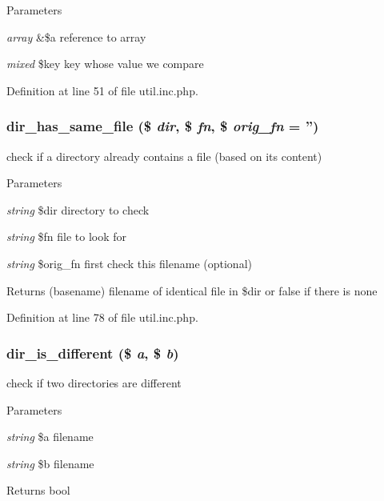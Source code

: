 \begin{DoxyParams}{Parameters}
\item[{\em array}]\&\$a reference to array \item[{\em mixed}]\$key key whose value we compare \end{DoxyParams}


Definition at line 51 of file util.inc.php.

\hypertarget{util_8inc_8php_a7f3e06b0a6f405290cb4d7990b8ac5c6}{
\subsubsection[{dir\_\-has\_\-same\_\-file}]{\setlength{\rightskip}{0pt plus 5cm}dir\_\-has\_\-same\_\-file (\$ {\em dir}, \/  \$ {\em fn}, \/  \$ {\em orig\_\-fn} = {\ttfamily ''})}}
\label{util_8inc_8php_a7f3e06b0a6f405290cb4d7990b8ac5c6}
check if a directory already contains a file (based on its content)


\begin{DoxyParams}{Parameters}
\item[{\em string}]\$dir directory to check \item[{\em string}]\$fn file to look for \item[{\em string}]\$orig\_\-fn first check this filename (optional) \end{DoxyParams}
\begin{DoxyReturn}{Returns}
(basename) filename of identical file in \$dir or false if there is none 
\end{DoxyReturn}


Definition at line 78 of file util.inc.php.

\hypertarget{util_8inc_8php_a6309f576f2611237288d0dd3eed09db3}{
\subsubsection[{dir\_\-is\_\-different}]{\setlength{\rightskip}{0pt plus 5cm}dir\_\-is\_\-different (\$ {\em a}, \/  \$ {\em b})}}
\label{util_8inc_8php_a6309f576f2611237288d0dd3eed09db3}
check if two directories are different


\begin{DoxyParams}{Parameters}
\item[{\em string}]\$a filename \item[{\em string}]\$b filename \end{DoxyParams}
\begin{DoxyReturn}{Returns}
bool 
\end{DoxyReturn}


